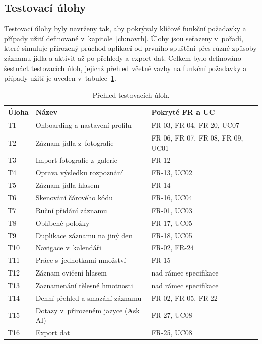 \subsection{Testovací úlohy}
\label{subsec:testovaciUlohy}

Testovací úlohy byly navrženy tak, aby pokrývaly klíčové funkční požadavky a případy užití definované v~kapitole~\ref{ch:navrh}.
Úlohy jsou seřazeny v~pořadí, které simuluje přirozený průchod aplikací od prvního spuštění přes různé způsoby záznamu jídla a aktivit až po přehledy a export dat.
Celkem bylo definováno šestnáct testovacích úloh, jejichž přehled včetně vazby na funkční požadavky a případy užití je uveden v~tabulce~\ref{tab:ulohy}.

\begin{table}[ht]
	\centering
	\caption{Přehled testovacích úloh.}
	\label{tab:ulohy}
	\small
	\setlength{\tabcolsep}{4pt}
	\begin{tabular}{p{0.8cm}p{5.5cm}p{5.5cm}}
		\toprule
		\textbf{Úloha} & \textbf{Název} & \textbf{Pokryté FR a UC} \\
		\midrule
		T1 & Onboarding a nastavení profilu & FR-03, FR-04, FR-20, UC07 \\
		T2 & Záznam jídla z~fotografie & FR-06, FR-07, FR-08, FR-09, UC01 \\
		T3 & Import fotografie z~galerie & FR-12 \\
		T4 & Oprava výsledku rozpoznání & FR-13, UC02 \\
		T5 & Záznam jídla hlasem & FR-14 \\
		T6 & Skenování čárového kódu & FR-16, UC04 \\
		T7 & Ruční přidání záznamu & FR-01, UC03 \\
		T8 & Oblíbené položky & FR-17, UC05 \\
		T9 & Duplikace záznamu na jiný den & FR-18, UC05 \\
		T10 & Navigace v~kalendáři & FR-02, FR-24 \\
		T11 & Práce s~jednotkami množství & FR-15 \\
		T12 & Záznam cvičení hlasem & nad rámec specifikace \\
		T13 & Zaznamenání tělesné hmotnosti & nad rámec specifikace \\
		T14 & Denní přehled a smazání záznamu & FR-02, FR-05, FR-22 \\
		T15 & Dotazy v~přirozeném jazyce (Ask AI) & FR-27, UC08 \\
		T16 & Export dat & FR-25, UC08 \\
		\bottomrule
	\end{tabular}
\end{table}

